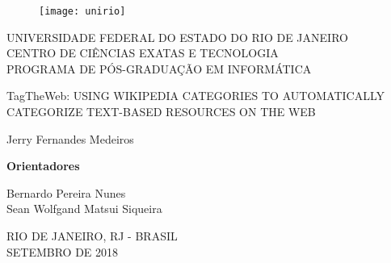 \begin{figure}[!h]
    \centering
    \texttt{[image: unirio]}
\end{figure}
\begin{center}
    UNIVERSIDADE FEDERAL DO ESTADO DO RIO DE JANEIRO \\ CENTRO DE CIÊNCIAS EXATAS E TECNOLOGIA \\ PROGRAMA DE PÓS-GRADUAÇÃO EM INFORMÁTICA
    \vskip 7.0cm

   TagTheWeb: USING WIKIPEDIA CATEGORIES TO AUTOMATICALLY CATEGORIZE TEXT-BASED RESOURCES ON THE WEB
    \vskip 1.0cm

    Jerry Fernandes Medeiros
    \vskip 2.0cm
\end{center}
\begin{flushright}
    \textbf{Orientadores}

    Bernardo Pereira Nunes\\
    Sean Wolfgand Matsui Siqueira
\end{flushright}
\begin{center}
    RIO DE JANEIRO, RJ - BRASIL \\ SETEMBRO DE 2018
\end{center}

